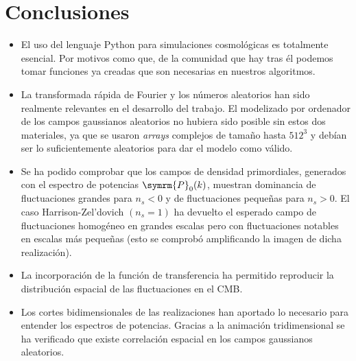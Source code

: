 \chapter{Conclusiones}
\begin{itemize}
    \item El uso del lenguaje Python para simulaciones cosmológicas es totalmente esencial. Por motivos como que, de la comunidad que hay tras él podemos tomar funciones ya creadas que son necesarias en nuestros algoritmos.
    \item La transformada rápida de Fourier y los números aleatorios han sido realmente relevantes en el desarrollo del trabajo. El modelizado por ordenador de los campos gaussianos aleatorios no hubiera sido posible sin estos dos materiales, ya que se usaron \textit{arrays} complejos de tamaño hasta \(512^3\) y debían ser lo suficientemente aleatorios para dar el modelo como válido.
    \item Se ha podido comprobar que los campos de densidad primordiales, generados con el espectro de potencias \(\symrm{P}_0(k)\), muestran dominancia de fluctuaciones grandes para \(n_s<0\) y de fluctuaciones pequeñas para \(n_s>0\). El caso Harrison-Zel'dovich \((n_s=1)\) ha devuelto el esperado campo de fluctuaciones homogéneo en grandes escalas pero con fluctuaciones notables en escalas más pequeñas (esto se comprobó amplificando la imagen de dicha realización).
    \item La incorporación de la función de transferencia ha permitido reproducir la distribución espacial de las fluctuaciones en el CMB.
    \item Los cortes bidimensionales de las realizaciones han aportado lo necesario para entender los espectros de potencias. Gracias a la animación tridimensional se ha verificado que existe correlación espacial en los campos gaussianos aleatorios.
\end{itemize}
